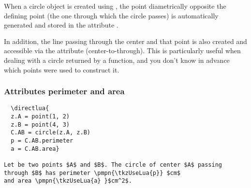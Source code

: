 \noindent
When a circle object is created using , the point diametrically opposite the defining point (the one through which the circle passes) is automatically generated and stored in the attribute .

\medskip
\noindent
In addition, the line passing through the center and that point is also created and accessible via the attribute  (center-to-through). This is particularly useful when dealing with a circle returned by a function, and you don't know in advance which points were used to construct it.

\vspace{1em}

\begin{tkzexample}[latex=7cm]
\begin{center}
\end{center}
\end{tkzexample}


\subsubsection{Attributes perimeter and area}
\label{ssub:attributes_perimeter_and_area}

 \let\pmpn\pgfmathprintnumber

\begin{mybox}
\begin{verbatim}
  \directlua{
  z.A = point(1, 2)
  z.B = point(4, 3)
  C.AB = circle(z.A, z.B)
  p = C.AB.perimeter
  a = C.AB.area}

Let be two points $A$ and $B$. The circle of center $A$ passing
through $B$ has perimeter \pmpn{\tkzUseLua{p}} $cm$
and area \pmpn{\tkzUseLua{a} }$cm^2$.
\end{verbatim}
\end{mybox}


